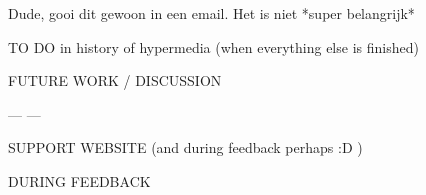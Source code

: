 Dude, gooi dit gewoon in een email. Het is niet *super belangrijk*

TO DO in history of hypermedia (when everything else is finished)

FUTURE WORK / DISCUSSION

--- ---

SUPPORT WEBSITE (and during feedback perhaps :D )

DURING FEEDBACK
